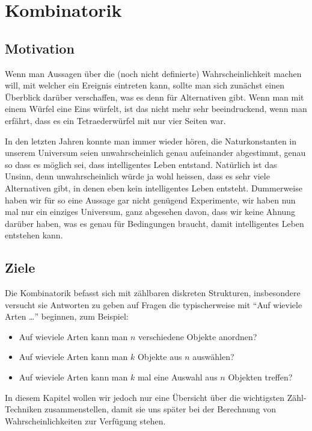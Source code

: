 %
%
%
\chapter{Kombinatorik} \label{chapter:kombinatorik}
\section{Motivation}
Wenn man Aussagen über die (noch nicht definierte) Wahrscheinlichkeit
machen will, mit welcher ein Ereignis eintreten kann, sollte man sich
zunächst einen Überblick darüber verschaffen, was es denn für
Alternativen gibt.
Wenn man mit einem Würfel eine Eins würfelt, ist
das nicht mehr sehr beeindruckend, wenn man erfährt, dass es ein
Tetraederwürfel mit nur vier Seiten war. 

In den letzten Jahren konnte man immer wieder hören, die Naturkonstanten
in unserem Universum seien unwahrscheinlich genau aufeinander abgestimmt,
genau so dass es möglich sei, dass intelligentes Leben entstand.
Natürlich ist das Unsinn, denn unwahrscheinlich würde ja wohl
heissen, dass es sehr viele Alternativen gibt, in denen eben kein
intelligentes Leben entsteht.
Dummerweise haben wir für so eine Aussage
gar nicht genügend Experimente, wir haben nun mal nur ein einziges
Universum, ganz abgesehen davon, dass wir keine Ahnung darüber haben,
was es genau für Bedingungen braucht, damit intelligentes Leben
entstehen kann.

\section{Ziele}
Die Kombinatorik befasst sich mit zählbaren diskreten Strukturen,
insbesondere versucht sie Antworten zu geben auf Fragen die
typischerweise mit ``Auf wieviele Arten \dots'' beginnen, zum Beispiel:
\begin{itemize}
\item Auf wieviele Arten kann man $n$ verschiedene Objekte anordnen?
\item Auf wieviele Arten kann man $k$ Objekte aus $n$ auswählen?
\item Auf wieviele Arten kann man $k$ mal eine Auswahl aus $n$ Objekten
treffen?
\end{itemize}

In diesem Kapitel wollen wir jedoch nur eine Übersicht über die
wichtigsten Zähl-Techniken zusammenstellen, damit sie uns später
bei der Berechnung von Wahrscheinlichkeiten zur Verfügung stehen.

